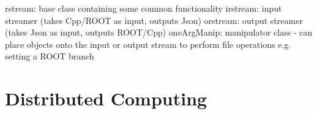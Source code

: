 \begin{itemize}
\li rstream: base class containing some common functionality
\li irstream: input streamer (takes Cpp/ROOT as input, outputs Json)
\li orstream: output streamer (takes Json as input, outputs ROOT/Cpp)
\li oneArgManip: manipulator class - can place objects onto the input or output stream to perform file operations e.g. setting a ROOT branch
\end{itemize}

\section{Distributed Computing}


